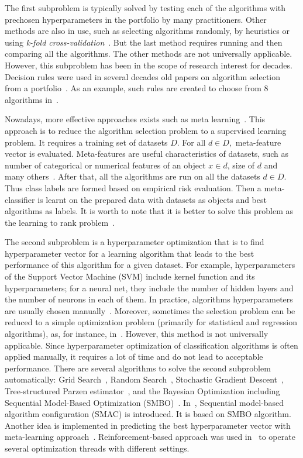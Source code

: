 \documentclass{svproc}
\begin{document}
The first subproblem is typically solved by testing each of the algorithms with prechosen hyperparameters in the portfolio by many practitioners. Other methods are also in use, such as selecting algorithms randomly, by heuristics or using \emph{k-fold cross-validation}~\cite{kfoldcv}. But the last method requires running and then comparing all the algorithms. The other methods are not universally applicable. However, this subproblem has been in the scope of research interest for decades. Decision rules were used in several decades old papers on algorithm selection from a portfolio~\cite{aha}. As an example, such rules are created to choose from 8 algorithms in~\cite{alism}.

Nowadays, more effective approaches exists such as meta learning~\cite{metalearn,abdulrahman2015algorithm}. This approach is to reduce the algorithm selection problem to a supervised learning problem. It requires a training set of datasets $D$. For all $d \in D,$ meta-feature vector is evaluated. Meta-features are useful characteristics of datasets, such as number of categorical or numerical features of an object $x \in d$, size of $d$ and many others~\cite{afil2015,castiello2005meta}. After that, all the algorithms are run on all the datasets $d \in D$. Thus class labels are formed based on empirical risk evaluation. Then a meta-classifier is learnt on the prepared data with datasets as objects and best algorithms as labels. It is worth to note that it is better to solve this problem as the learning to rank problem~\cite{brazdil2003ranking,cashmeta2}.

The second subproblem is a hyperparameter optimization that is to find hyperparameter vector for a learning algorithm that leads to the best performance of this algorithm for a given dataset. For example, hyperparameters of the Support Vector Machine (SVM) include kernel function and its hyperparameters; for a neural net, they include the number of hidden layers and the number of neurons in each of them. In practice, algorithms hyperparameters are usually chosen manually~\cite{hutman}. Moreover, sometimes the selection problem can be reduced to a simple optimization problem (primarily for statistical and regression algorithms), as, for instance, in~\cite{strijov}. However, this method is not universally applicable. Since hyperparameter optimization of classification algorithms is often applied manually, it requires a lot of time and do not lead to acceptable performance. There are several algorithms to solve the second subproblem automatically: Grid Search~\cite{random}, Random Search~\cite{grid}, Stochastic Gradient Descent~\cite{sgd}, Tree-structured Parzen estimator~\cite{tpe}, and the Bayesian Optimization including Sequential Model-Based Optimization (SMBO)~\cite{bayes1}. In~\cite{smac}, Sequential model-based algorithm configuration (SMAC) is introduced. It is based on SMBO algorithm. Another idea is implemented in predicting the best hyperparameter vector with meta-learning approach~\cite{mantovani2015meta}. Reinforcement-based approach was used in~\cite{jamieson2015non} to operate several optimization threads with different settings.
\end{document}
